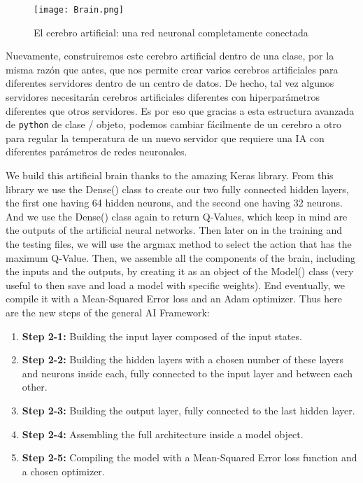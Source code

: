 \documentclass[]{book}
\begin{document}
\begin{figure}
\centering
\texttt{[image: Brain.png]}
\caption{El cerebro artificial: una red neuronal completamente conectada}
\end{figure}

Nuevamente, construiremos este cerebro artificial dentro de una clase, por la misma razón que antes, que nos permite crear varios cerebros artificiales para diferentes servidores dentro de un centro de datos. De hecho, tal vez algunos servidores necesitarán cerebros artificiales diferentes con hiperparámetros diferentes que otros servidores. Es por eso que gracias a esta estructura avanzada de \texttt{python} de clase / objeto, podemos cambiar fácilmente de un cerebro a otro para regular la temperatura de un nuevo servidor que requiere una IA con diferentes parámetros de redes neuronales.

We build this artificial brain thanks to the amazing Keras library. From this library we use the Dense() class to create our two fully connected hidden layers, the first one having 64 hidden neurons, and the second one having 32 neurons. And we use the Dense() class again to return Q-Values, which keep in mind are the outputs of the artificial neural networks. Then later on in the training and the testing files, we will use the argmax method to select the action that has the maximum Q-Value. Then, we assemble all the components of the brain, including the inputs and the outputs, by creating it as an object of the Model() class (very useful to then save and load a model with specific weights). End eventually, we compile it with a Mean-Squared Error loss and an Adam optimizer. Thus here are the new steps of the general AI Framework:

\begin{enumerate}
    \item \textbf{Step 2-1:} Building the input layer composed of the input states.
    \item \textbf{Step 2-2:} Building the hidden layers with a chosen number of these layers and neurons inside each, fully connected to the input layer and between each other.
    \item \textbf{Step 2-3:} Building the output layer, fully connected to the last hidden layer.
    \item \textbf{Step 2-4:} Assembling the full architecture inside a model object.
    \item \textbf{Step 2-5:} Compiling the model with a Mean-Squared Error loss function and a chosen optimizer.
\end{enumerate}
\end{document}
